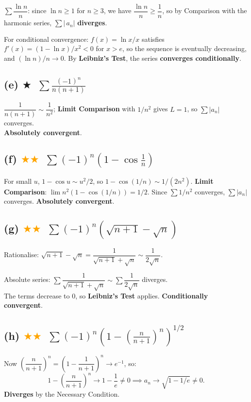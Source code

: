\documentclass[12pt,a4paper]{article}
\newcommand{\easy}{\textcolor{green!60!black}{$\bigstar$}}
\newcommand{\medium}{\textcolor{orange}{$\bigstar\bigstar$}}
\begin{document}
$\sum\dfrac{\ln n}{n}$: since $\ln n\geq 1$ for $n\geq 3$, we have $\dfrac{\ln n}{n}\geq\dfrac{1}{n}$, so by Comparison with the harmonic series, $\sum|\,a_n|$ \textbf{diverges}.

For conditional convergence: $f(x)=\ln x/x$ satisfies $f'(x)=(1-\ln x)/x^2 <0$ for $x>e$, so the sequence is eventually decreasing, and $(\ln n)/n\to 0$.  By \textbf{Leibniz's Test}, the series \textbf{converges conditionally}.

\subsection*{(e) \easy\ $\displaystyle\sum\frac{(-1)^n}{n(n+1)}$}

$\dfrac{1}{n(n+1)}\sim\dfrac{1}{n^2}$; \textbf{Limit Comparison} with $1/n^2$ gives $L=1$, so $\sum|a_n|$ converges.\\
\textbf{Absolutely convergent}.

\subsection*{(f) \medium\ $\displaystyle\sum(-1)^n\!\left(1-\cos\frac{1}{n}\right)$}

For small $u$, $1-\cos u\sim u^2/2$, so $1-\cos(1/n)\sim 1/(2n^2)$.  \textbf{Limit Comparison}: $\lim n^2(1-\cos(1/n))=1/2$.  Since $\sum 1/n^2$ converges, $\sum|a_n|$ converges.  \textbf{Absolutely convergent}.

\subsection*{(g) \medium\ $\displaystyle\sum(-1)^n\!\left(\sqrt{n+1}-\sqrt{n}\right)$}

Rationalise: $\sqrt{n+1}-\sqrt{n}=\dfrac{1}{\sqrt{n+1}+\sqrt{n}}\sim\dfrac{1}{2\sqrt{n}}$.

Absolute series: $\sum\dfrac{1}{\sqrt{n+1}+\sqrt{n}}\sim\sum\dfrac{1}{2\sqrt{n}}$ diverges.\\
The terms decrease to $0$, so \textbf{Leibniz's Test} applies. \textbf{Conditionally convergent}.

\subsection*{(h) \medium\ $\displaystyle\sum(-1)^n\!\left(1-\!\left(\frac{n}{n+1}\right)^n\right)^{\!1/2}$}

Now $\left(\dfrac{n}{n+1}\right)^n = \left(1-\dfrac{1}{n+1}\right)^n\to e^{-1}$, so:
\[
  1 - \left(\frac{n}{n+1}\right)^n \to 1 - \frac{1}{e} \neq 0
  \implies a_n \to \sqrt{1-1/e}\neq 0.
\]
\textbf{Diverges} by the Necessary Condition.
\end{document}
